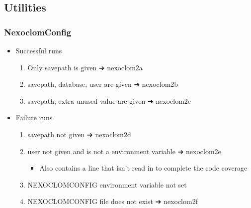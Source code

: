 \documentclass[letterpaper,10pt,english]{sphinxmanual}
\begin{document}
\subsection{Utilities}
\label{\detokenize{nexoclom2/TestCases:utilities}}

\subsubsection{NexoclomConfig}
\label{\detokenize{nexoclom2/TestCases:nexoclomconfig}}\begin{itemize}
\item {} 
\sphinxAtStartPar
Successful runs
\begin{enumerate}
%
\item {} 
\sphinxAtStartPar
Only savepath is given ➔ nexoclom2a

\item {} 
\sphinxAtStartPar
savepath, database, user are given ➔ nexoclom2b

\item {} 
\sphinxAtStartPar
savepath, extra unused value are given ➔ nexoclom2c

\end{enumerate}

\item {} 
\sphinxAtStartPar
Failure runs
\begin{enumerate}
%
\item {} 
\sphinxAtStartPar
savepath not given ➔ nexoclom2d

\item {} 
\sphinxAtStartPar
user not given and is not a environment variable ➔ nexoclom2e
\begin{itemize}
\item {} 
\sphinxAtStartPar
Also contains a line that isn’t read in to complete the code coverage

\end{itemize}

\item {} 
\sphinxAtStartPar
NEXOCLOMCONFIG environment variable not set

\item {} 
\sphinxAtStartPar
NEXOCLOMCONFIG file does not exist ➔ nexoclom2f

\end{enumerate}

\end{itemize}
\end{document}
